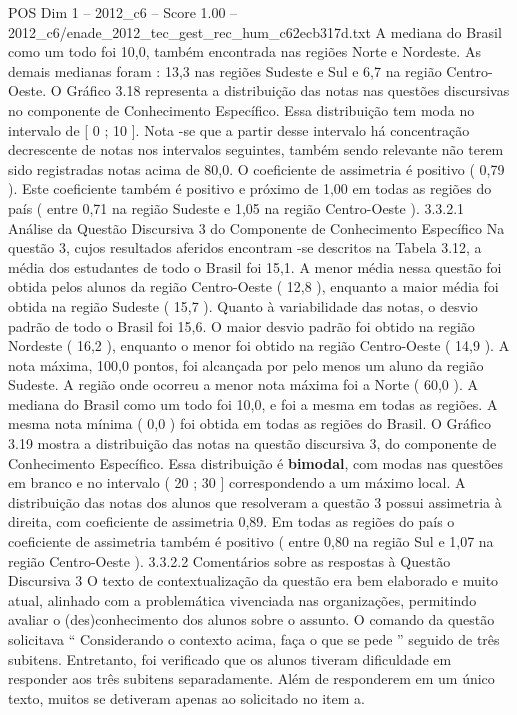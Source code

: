 \begin{textsample}{POS Dim 1 – 2012\_c6 – Score 1.00 – 2012\_c6/enade\_2012\_tec\_gest\_rec\_hum\_c62ecb317d.txt}
A mediana do Brasil como um todo foi 10,0, também encontrada nas regiões Norte e Nordeste.
As demais medianas foram : 13,3 nas regiões Sudeste e Sul e 6,7 na região Centro-Oeste.
O Gráfico 3.18 representa a distribuição das notas nas questões discursivas no componente de Conhecimento Específico.
Essa distribuição tem moda no intervalo de [ 0 ; 10 ].
Nota -se que a partir desse intervalo há concentração decrescente de notas nos intervalos seguintes, também sendo relevante não terem sido registradas notas acima de 80,0.
O coeficiente de assimetria é positivo ( 0,79 ).
Este coeficiente também é positivo e próximo de 1,00 em todas as regiões do país ( entre 0,71 na região Sudeste e 1,05 na região Centro-Oeste ). 3.3.2.1 Análise da Questão Discursiva 3 do Componente de Conhecimento Específico Na questão 3, cujos resultados aferidos encontram -se descritos na Tabela 3.12, a média dos estudantes de todo o Brasil foi 15,1.
A menor média nessa questão foi obtida pelos alunos da região Centro-Oeste ( 12,8 ), enquanto a maior média foi obtida na região Sudeste ( 15,7 ).
Quanto à variabilidade das notas, o desvio padrão de todo o Brasil foi 15,6.
O maior desvio padrão foi obtido na região Nordeste ( 16,2 ), enquanto o menor foi obtido na região Centro-Oeste ( 14,9 ).
A nota máxima, 100,0 pontos, foi alcançada por pelo menos um aluno da região Sudeste.
A região onde ocorreu a menor nota máxima foi a Norte ( 60,0 ).
A mediana do Brasil como um todo foi 10,0, e foi a mesma em todas as regiões.
A mesma nota mínima ( 0,0 ) foi obtida em todas as regiões do Brasil.
O Gráfico 3.19 mostra a distribuição das notas na questão discursiva 3, do componente de Conhecimento Específico.
Essa distribuição é \textbf{bimodal}, com modas nas questões em branco e no intervalo ( 20 ; 30 ] correspondendo a um máximo local.
A distribuição das notas dos alunos que resolveram a questão 3 possui assimetria à direita, com coeficiente de assimetria 0,89.
Em todas as regiões do país o coeficiente de assimetria também é positivo ( entre 0,80 na região Sul e 1,07 na região Centro-Oeste ). 3.3.2.2 Comentários sobre as respostas à Questão Discursiva 3 O texto de contextualização da questão era bem elaborado e muito atual, alinhado com a problemática vivenciada nas organizações, permitindo avaliar o (des)conhecimento dos alunos sobre o assunto.
O comando da questão solicitava “ Considerando o contexto acima, faça o que se pede ” seguido de três subitens.
Entretanto, foi verificado que os alunos tiveram dificuldade em responder aos três subitens separadamente.
Além de responderem em um único texto, muitos se detiveram apenas ao solicitado no item a.

\end{textsample}
